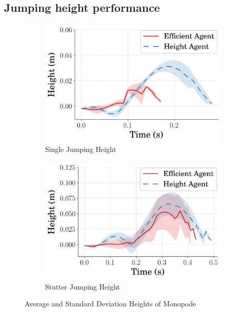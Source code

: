 \subsection{Jumping height performance}
\label{subsection:avg_height_performance}
% 
\begin{figure}[tb!]
  \centering
  \begin{subfigure}{.49\textwidth}
    \centering
    \includegraphics[width=\linewidth]{Figures/Ch2/avg_One_RodPos_.png}
    \caption{Single Jumping Height}
    \label{fig:avg_one_rodpos}
  \end{subfigure}%
  \hfill
  \begin{subfigure}{.49\textwidth}
    \centering
    \includegraphics[width=\linewidth]{Figures/Ch2/avg_Stutter_RodPos_.png}
     \caption{Stutter Jumping Height}
     \label{fig:avg_stutter_rodpos}
  \end{subfigure}
   \caption{Average and Standard Deviation Heights of Monopode}
   \label{fig:avg_rodpos}
\end{figure}
% 

